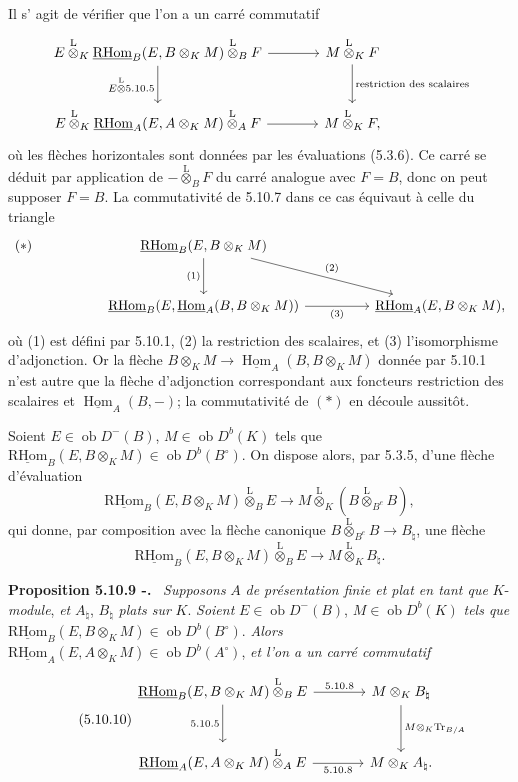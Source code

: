 \documentclass[11pt]{article}
\newenvironment{statement}[1]{\par\medskip\noindent\textbf{#1.}\ }{\par\medskip}
\DeclareMathOperator{\Hom}{Hom}
\newcommand{\R}{\mathrm{R}}\newcommand{\RHomCore}{\mathrm{RHom}}
\newcommand{\ob}{\operatorname{ob}}
\providecommand{\RHom}{\RHomCore}
\providecommand{\uRHom}{\underline{\RHom}}
\providecommand{\uHom}{\underline{\Hom}}
\providecommand{\Tr}{\operatorname{Tr}}
\providecommand{\Tr}{\operatorname{Tr}}
\providecommand{\lten}{\overset{\mathrm L}{\otimes}}
\providecommand{\Tr}{\operatorname{Tr}}
\providecommand{\RHom}{\RHomCore}
\providecommand{\Hom}{\operatorname{Hom}}
\providecommand{\ob}{\operatorname{ob}}
\providecommand{\lten}{\overset{\mathrm L}{\otimes}}
\providecommand{\RHom}{\R\mathcal{H}om}
\providecommand{\lten}{\overset{\mathrm L}{\otimes}}
\providecommand{\R}{\mathrm R}
\providecommand{\Tr}{\operatorname{Tr}}
\providecommand{\lten}{\overset{\mathrm L}{\otimes}}
\providecommand{\lten}{\overset{\mathrm L}{\otimes}}
\providecommand{\lten}{\overset{\mathrm L}{\otimes}}
\providecommand{\RHom}{\RHomCore}
\providecommand{\Hom}{\operatorname{Hom}}
\providecommand{\Tr}{\operatorname{Tr}}
\providecommand{\lten}{\overset{\mathrm L}{\otimes}}
\begin{document}
Il s'%
agit de vérifier que l'on a un carré commutatif
\[
\begin{tikzcd}[column sep=large,row sep=large]
E\lten_K\uRHom_B(E,B\otimes_KM)\lten_BF \arrow[r] \arrow[d,"E\lten 5.10.5"'] & M\lten_KF \arrow[d,"\text{restriction des scalaires}"]\\
E\lten_K\uRHom_A(E,A\otimes_KM)\lten_AF \arrow[r] & M\lten_KF,
\end{tikzcd}
\]
où les flèches horizontales sont données par les évaluations (5.3.6). Ce carré se déduit par application de $-\lten_BF$ du carré analogue avec $F=B$, donc on peut supposer $F=B$. La commutativité de 5.10.7 dans ce cas équivaut à celle du triangle
\[
\begin{tikzcd}[column sep=huge,row sep=large]
|[alias=star]| {(*)} & \uRHom_B(E,B\otimes_KM) \arrow[d,"(1)"'] \arrow[dr,"(2)"] & \\
& \uRHom_B(E,\uHom_A(B,B\otimes_KM)) \arrow[r,"(3)"'] & \uRHom_A(E,B\otimes_KM),
\end{tikzcd}
\]
où (1) est défini par 5.10.1, (2) la restriction des scalaires, et (3) l'isomorphisme d'adjonction. Or la flèche $B\otimes_KM\to\uHom_A(B,B\otimes_KM)$ donnée par 5.10.1 n'est autre que la flèche d'adjonction correspondant aux foncteurs restriction des scalaires et $\uHom_A(B,-)$; la commutativité de $(*)$ en découle aussitôt.

Soient $E\in\ob D^-(B)$, $M\in\ob D^b(K)$ tels que $\uRHom_B(E,B\otimes_KM)\in\ob D^b(B^\circ)$. On dispose alors, par 5.3.5, d'une flèche d'évaluation
\[
\uRHom_B(E,B\otimes_KM)\lten_BE\longrightarrow M\lten_K(B\lten_{B^e}B),
\]
qui donne, par composition avec la flèche canonique $B\lten_{B^e}B\to B_\natural$, une flèche
\begin{equation}\tag{5.10.8}
\uRHom_B(E,B\otimes_KM)\lten_BE\longrightarrow M\lten_KB_\natural.
\end{equation}

\begin{statement}{Proposition 5.10.9 -}
\emph{Supposons} $A$ \emph{de présentation finie et plat en tant que} $K$-\emph{module}, \emph{et} $A_\natural$, $B_\natural$ \emph{plats sur} $K$. \emph{Soient} $E\in\ob D^-(B)$, $M\in\ob D^b(K)$ \emph{tels que} $\uRHom_B(E,B\otimes_KM)\in\ob D^b(B^\circ)$. \emph{Alors} $\uRHom_A(E,A\otimes_KM)\in\ob D^b(A^\circ)$, \emph{et l'on a un carré commutatif}
\begin{equation}\tag{5.10.10}
\begin{tikzcd}[column sep=large,row sep=large]
\uRHom_B(E,B\otimes_KM)\lten_BE \arrow[r,"5.10.8"] \arrow[d,"5.10.5"'] & M\otimes_KB_\natural \arrow[d,"M\otimes_K\Tr_{B/A}"]\\
\uRHom_A(E,A\otimes_KM)\lten_AE \arrow[r,"5.10.8"'] & M\otimes_KA_\natural .
\end{tikzcd}
\end{equation}
\end{statement}
\end{document}
